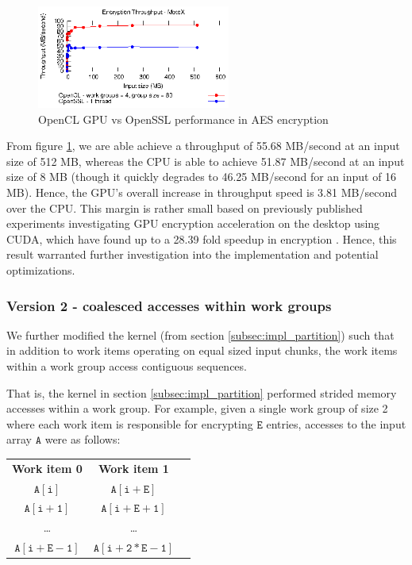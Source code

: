 \documentclass[conference,10pt]{IEEEtran}
\begin{document}
\begin{figure}[!t]
\centering
\includegraphics[width=2.5in]{../final/motox/4.2/opencl_sizes_vs_cpu_sizes.shared_tbox_4G_80L.cpu_1thread.eps}
\caption{OpenCL GPU vs OpenSSL performance in AES encryption}
\label{fig:opencl_vs_cpu}
\end{figure}

From figure \ref{fig:opencl_vs_cpu}, we are able achieve a throughput of 55.68 MB/second at an input 
size of 512 MB, whereas the CPU is able to achieve 51.87 MB/second at an input size of 8 MB (though 
it quickly degrades to 46.25 MB/second for an input of 16 MB).  Hence, the GPU's overall increase in 
throughput speed is 3.81 MB/second over the CPU.  This margin is rather small based on previously 
published experiments investigating GPU encryption acceleration on the desktop using CUDA, which 
have found up to a 28.39 fold speedup in encryption \cite{aes_cuda}.  Hence, this result warranted 
further investigation into the implementation and potential optimizations.

\subsubsection{Version 2 - coalesced accesses within work groups}
\label{subsec:impl_coalesce}

We further modified the kernel (from section \ref{subsec:impl_partition}) such that in addition to 
work items operating on equal sized input chunks, the work items within a work group access 
contiguous sequences.  

That is, the kernel in section \ref{subsec:impl_partition} performed strided memory accesses 
\cite{gpu_mem} within a work group.  For example, given a single work group of size 2 where each 
work item is responsible for encrypting $\mathtt{E}$ entries, accesses to the input array 
$\mathtt{A}$ were as follows:

\begin{table}[h]
\centering
\begin{tabular}{ccc}
    \textbf{Work item 0} & \textbf{Work item 1} \\
    $\mathtt{A[i]}$         & $\mathtt{A[i + E]}$ \\
    $\mathtt{A[i + 1]}$     & $\mathtt{A[i + E + 1]}$ \\
    \ldots       & \ldots \\
    $\mathtt{A[i + E - 1]}$ & $\mathtt{A[i + 2*E - 1]}$ \\
\end{tabular}
\end{table}
\end{document}
